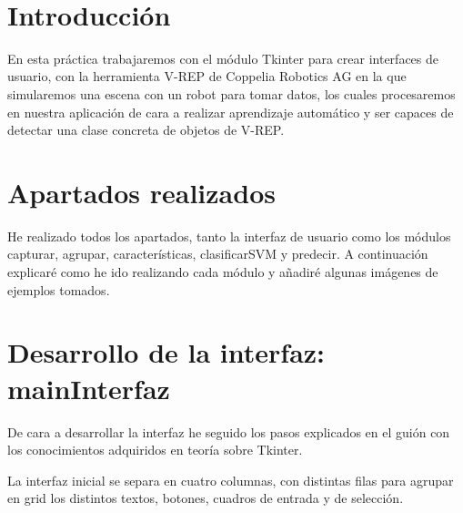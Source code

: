 \documentclass[12pt, spanish]{article}
\makeatletter
\let\thedate\@date
\makeatother
\begin{document}
\begin{titlepage}
    {\large \thedate}\\[0.5cm]
    {\doclicenseThis}

    \vfill

\end{titlepage}


\tableofcontents
\pagebreak



\section*{Introducción}

En esta práctica trabajaremos con el módulo Tkinter para crear interfaces de usuario, con la herramienta V-REP de Coppelia Robotics AG en la que simularemos una escena con un robot para tomar datos, los cuales procesaremos en nuestra aplicación de cara a realizar aprendizaje automático y ser capaces de detectar una clase concreta de objetos de V-REP.

\section{Apartados realizados}

He realizado todos los apartados, tanto la interfaz de usuario como los módulos capturar, agrupar, características, clasificarSVM y predecir. A continuación explicaré como he ido realizando cada módulo y añadiré algunas imágenes de ejemplos tomados. 

\section{Desarrollo de la interfaz: mainInterfaz}

De cara a desarrollar la interfaz he seguido los pasos explicados en el guión con los conocimientos adquiridos en teoría sobre Tkinter.

La interfaz inicial se separa en cuatro columnas, con distintas filas para agrupar en grid los distintos textos, botones, cuadros de entrada y de selección.
\end{document}
